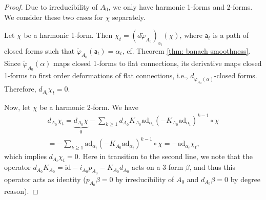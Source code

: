 \documentclass[11pt,a4paper]{amsart}
\theoremstyle{plain} %
\theoremstyle{definition}
\theoremstyle{remark}
\newcommand{\mr}{\mathrm}
\newcommand{\sfa}{\mathsf{a}}
\newcommand{\til}{\widetilde}
\newcommand{\ad}{\mathrm{ad}}
\begin{document}
{\begin{proof}
    Due to irreducibility of $A_0$, we only have harmonic 1-forms and 2-forms. We consider these two cases for $\chi$ separately.

    Let $\chi$ be a harmonic 1-form. Then $\chi_t = (d\til\varphi_{A_0})_{\sfa_t}(\chi)$, where $\sfa_t$ is a path of %
    closed forms such that $\til\varphi_{A_0}(\sfa_t)=\alpha_t$, cf. Theorem \ref{thm: banach smoothness}. Since $\til\varphi_{A_0}(\alpha)$ maps closed 1-forms to flat connections, its derivative maps closed 1-forms to first order deformations of flat connections, i.e., $d_{\til\varphi_{A_0}(\alpha)}$-closed forms.
    Therefore, $d_{A_t}\chi_t=0$.

    Now, let $\chi$ be a harmonic 2-form. We have
    \begin{multline*}
        d_{A_0}\chi_t=\underbrace{d_{A_0}\chi}_0-\sum_{k\geq 1} d_{A_0}K_{A_0}\ad_{\alpha_t}(-K_{A_0}\ad_{\alpha_t})^{k-1}\circ\chi\\
        = - \sum_{k\geq 1}\ad_{\alpha_t}(-K_{A_0}\ad_{\alpha_t})^{k-1}\circ\chi=- \ad_{\alpha_t} \chi_t,
    \end{multline*}
    which implies $d_{A_t}\chi_t=0$. 
    Here in transition to the second line, we note that the operator $d_{A_0}K_{A_0}=\mr{id}-i_{A_0}p_{A_0}-K_{A_0}d_{A_0}$ acts on a 3-form $\beta$, and thus this operator acts as identity ($p_{A_0}\beta=0$ by irreducibility of $A_0$ and $d_{A_0}\beta=0$ by degree reason).
\end{proof}




}
\end{document}
